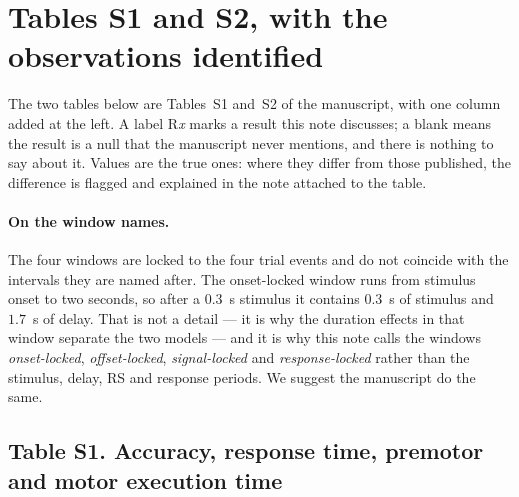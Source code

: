 \section{Tables S1 and S2, with the observations identified}
\label{app:obs}

The two tables below are Tables~S1 and~S2 of the manuscript, with one column added at the
left. A label R\emph{x} marks a result this note discusses; a blank means the result is a
null that the manuscript never mentions, and there is nothing to say about it. Values are
the true ones: where they differ from those published, the difference is flagged and
explained in the note attached to the table.

\paragraph{On the window names.} The four windows are locked to the four trial events and
do not coincide with the intervals they are named after. The onset-locked window runs from
stimulus onset to two seconds, so after a $0.3$~s stimulus it contains $0.3$~s of stimulus
and $1.7$~s of delay. That is not a detail --- it is why the duration effects in that
window separate the two models --- and it is why this note calls the windows
\emph{onset-locked}, \emph{offset-locked}, \emph{signal-locked} and
\emph{response-locked} rather than the stimulus, delay, RS and response periods. We
suggest the manuscript do the same.

\subsection*{Table S1. Accuracy, response time, premotor and motor execution time}


